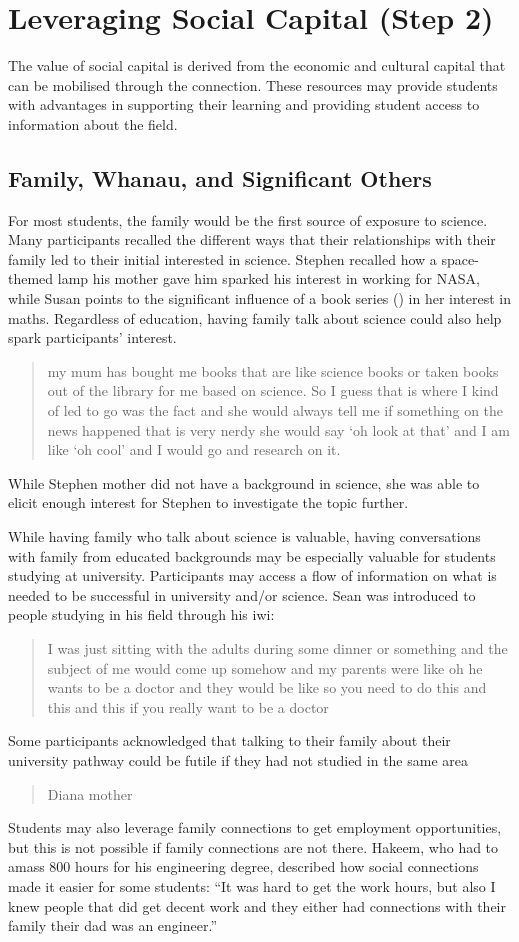 \section{Leveraging Social Capital (Step 2)}
The value of social capital is derived from the economic and cultural capital that can be mobilised through the connection. These resources may provide students with advantages in supporting their learning and providing student access to information about the field. 

\subsection{Family, Whanau, and Significant Others}
For most students, the family would be the first source of exposure to science. Many participants recalled the different ways that their relationships with their family led to their initial interested in science. Stephen recalled how a space-themed lamp his mother gave him sparked his interest in working for NASA, while Susan points to the significant influence of a book series () in her interest in maths. Regardless of education, having family talk about science could also help spark participants' interest. \blockquote{my mum has bought me books that are like science books or taken books out of the library for me based on science. So I guess that is where I kind of led to go was the fact and she would always tell me if something on the news happened that is very nerdy she would say `oh look at that' and I am like `oh cool' and I would go and research on it.} While Stephen mother did not have a background in science, she was able to elicit enough interest for Stephen to investigate the topic further.

While having family who talk about science is valuable, having conversations with family from educated backgrounds may be especially valuable for students studying at university. Participants may access a flow of information on what is needed to be successful in university and/or science. Sean was introduced to people studying in his field through his iwi: \blockquote{I was just sitting with the adults during some dinner or something and the subject of me would come up somehow and my parents were like oh he wants to be a doctor and they would be like so you need to do this and this and this if you really want to be a doctor}. Some participants acknowledged that talking to their family about their university pathway could be futile if they had not studied in the same area \blockquote{Diana mother}.  Students may also leverage family connections to get employment opportunities, but this is not possible if family connections are not there. Hakeem, who had to amass 800 hours for his engineering degree, described how social connections made it easier for some students: ``It was hard to get the work hours, but also I knew people that did get decent work and they either had connections with their family their dad was an engineer.''


